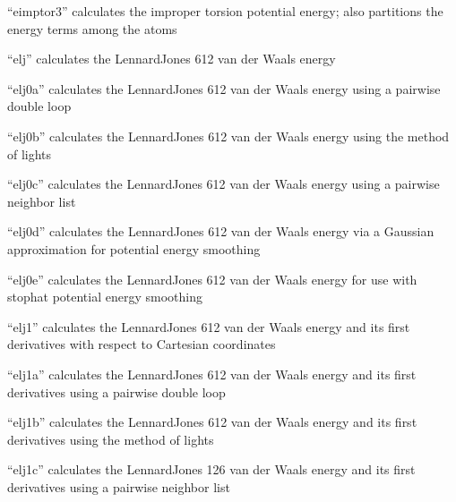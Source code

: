 \documentclass[letterpaper,11pt,english]{sphinxmanual}
\begin{document}
“eimptor3” calculates the improper torsion potential energy;
also partitions the energy terms among the atoms


“elj” calculates the Lennard\sphinxhyphen{}Jones 6\sphinxhyphen{}12 van der Waals energy


“elj0a” calculates the Lennard\sphinxhyphen{}Jones 6\sphinxhyphen{}12 van der Waals energy
using a pairwise double loop


“elj0b” calculates the Lennard\sphinxhyphen{}Jones 6\sphinxhyphen{}12 van der Waals energy
using the method of lights


“elj0c” calculates the Lennard\sphinxhyphen{}Jones 6\sphinxhyphen{}12 van der Waals energy
using a pairwise neighbor list


“elj0d” calculates the Lennard\sphinxhyphen{}Jones 6\sphinxhyphen{}12 van der Waals energy
via a Gaussian approximation for potential energy smoothing


“elj0e” calculates the Lennard\sphinxhyphen{}Jones 6\sphinxhyphen{}12 van der Waals energy
for use with stophat potential energy smoothing


“elj1” calculates the Lennard\sphinxhyphen{}Jones 6\sphinxhyphen{}12 van der Waals energy
and its first derivatives with respect to Cartesian coordinates


“elj1a” calculates the Lennard\sphinxhyphen{}Jones 6\sphinxhyphen{}12 van der Waals energy
and its first derivatives using a pairwise double loop


“elj1b” calculates the Lennard\sphinxhyphen{}Jones 6\sphinxhyphen{}12 van der Waals energy
and its first derivatives using the method of lights


“elj1c” calculates the Lennard\sphinxhyphen{}Jones 12\sphinxhyphen{}6 van der Waals energy
and its first derivatives using a pairwise neighbor list
\end{document}
